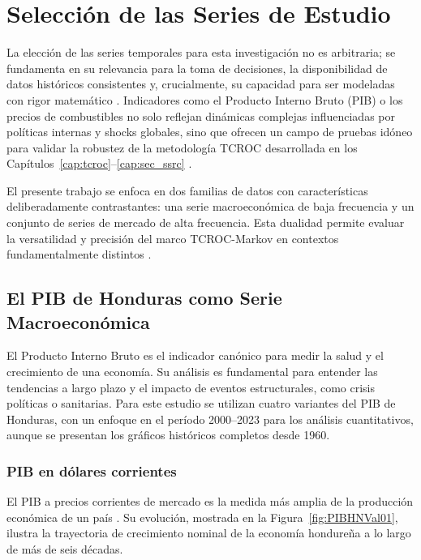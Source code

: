 \chapter{Selección de las Series de Estudio}
\label{chap:seleccionvariable}

La elección de las series temporales para esta investigación no es
arbitraria; se fundamenta en su relevancia para la toma de
decisiones, la disponibilidad de datos históricos consistentes y,
crucialmente, su capacidad para ser modeladas con rigor matemático
\cite{Forecasting2022}.  Indicadores como el Producto Interno Bruto
(PIB) o los precios de combustibles no solo reflejan dinámicas
complejas influenciadas por políticas internas y shocks globales,
sino que ofrecen un campo de pruebas idóneo para validar la robustez
de la metodología TCROC desarrollada en los
Capítulos~\ref{cap:tcroc}--\ref{cap:sec_ssrc}
\cite{EconHonduras, Hamilton1994}.

El presente trabajo se enfoca en dos familias de datos con
características deliberadamente contrastantes: una serie
macroeconómica de baja frecuencia y un conjunto de series de mercado
de alta frecuencia.  Esta dualidad permite evaluar la versatilidad y
precisión del marco TCROC-Markov en contextos fundamentalmente
distintos \cite{kolassa2023, Tsay2005}.

\section{El PIB de Honduras como Serie Macroeconómica}
\label{sec:pib_serie}

El Producto Interno Bruto es el indicador canónico para medir la
salud y el crecimiento de una economía.  Su análisis es fundamental
para entender las tendencias a largo plazo y el impacto de eventos
estructurales, como crisis políticas o sanitarias.  Para este
estudio se utilizan cuatro variantes del PIB de Honduras, con un
enfoque en el período 2000--2023 para los análisis cuantitativos,
aunque se presentan los gráficos históricos completos desde 1960.

\subsection{PIB en dólares corrientes}

El PIB a precios corrientes de mercado es la medida más amplia de la
producción económica de un país \cite{WorldBankGDP}.  Su evolución,
mostrada en la Figura~\ref{fig:PIBHNVal01}, ilustra la trayectoria
de crecimiento nominal de la economía hondureña a lo largo de más de
seis décadas.

